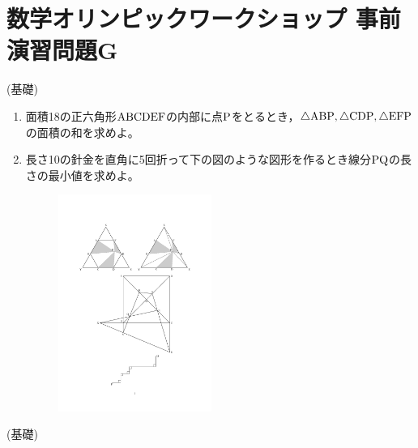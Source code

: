 \documentclass[a4paper,12pt,uplatex]{jsarticle}  %
\begin{document}
\section*{数学オリンピックワークショップ 事前演習問題G}

 (基礎)

\begin{enumerate}
\item 面積18の正六角形$\rm ABCDEF$の内部に点$\rm P$をとるとき，$\triangle {\rm ABP}, \triangle {\rm CDP}, \triangle {\rm EFP}$の面積の和を求めよ。

\item 長さ10の針金を直角に5回折って下の図のような図形を作るとき線分$\rm PQ$の長さの最小値を求めよ。

\begin{figure}[h]
  \centering
  \includegraphics[width=5.0cm]{jizen_1_2_problem.pdf}
\end{figure}


\end{enumerate}

\bigskip

 (基礎)
\end{document}
